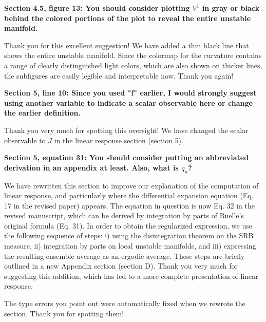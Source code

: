 \documentclass[11pt]{article}
\newcommand{\reviewerOne}[1]{{\color{burgundy}\textbf{#1}}}
\begin{document}
\reviewerOne{Section 4.5, figure 13: You should consider plotting $V^1$ in gray or black behind the colored portions of the plot to
reveal the entire unstable manifold.}

Thank you for this excellent suggestion! We have added a thin black line that shows the entire unstable manifold. Since the colormap for the curvature contains a range of clearly distinguished light colors, which are also shown on thicker lines, the subfigures are easily legible and interpretable now. Thank you again!   


\reviewerOne{Section 5, line 10: Since you used "f" earlier, I would strongly suggest using another variable to indicate a scalar
observable here or change the earlier definition.}

Thank you very much for spotting this oversight! We have changed the scalar observable to $J$ in the linear response section (section 5).

\reviewerOne{Section 5, equation 31: You should consider putting an abbreviated derivation in an appendix at least. Also, what
is $q_n$?}

We have rewritten this section to improve our explanation of the computation of linear response, and particularly where the differential expansion equation (Eq. 17 in the revised paper) appears. The equation in question is now Eq. 32 in the revised manuscript, which can be derived by integration by parts of Ruelle's original formula (Eq. 31). In order to obtain the regularized expression, we use the following sequence of steps: i) using the disintegration theorem on the SRB measure, ii) integration by parts on local unstable manifolds, and iii) expressing the resulting ensemble average as an ergodic average. These steps are briefly outlined in a new Appendix section (section D).
Thank you very much for suggesting this addition, which has led to a more complete presentation of linear response.

The type errors you point out were automatically fixed when we rewrote the section. Thank you for spotting them!
\end{document}
